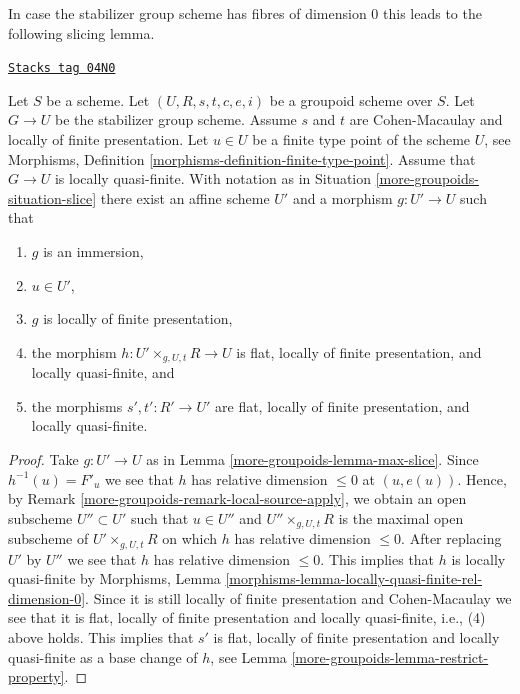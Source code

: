 In case the stabilizer group scheme has fibres of dimension 0
this leads to the following slicing lemma.

\begin{lemma}
\label{more-groupoids-lemma-max-slice-quasi-finite}
\href{https://stacks.math.columbia.edu/tag/04N0}{\texttt{Stacks tag 04N0}}

Let $S$ be a scheme.
Let $(U, R, s, t, c, e, i)$ be a groupoid scheme over $S$.
Let $G \to U$ be the stabilizer group scheme.
Assume $s$ and $t$ are Cohen-Macaulay and locally of finite presentation.
Let $u \in U$ be a finite type point of the scheme $U$, see
Morphisms, Definition \ref{morphisms-definition-finite-type-point}.
Assume that $G \to U$ is locally quasi-finite.
With notation as in
Situation \ref{more-groupoids-situation-slice}
there exist an affine scheme $U'$ and a morphism $g : U' \to U$ such that
\begin{enumerate}
\item $g$ is an immersion,
\item $u \in U'$,
\item $g$ is locally of finite presentation,
\item the morphism $h : U' \times_{g, U, t} R \longrightarrow U$
is flat, locally of finite presentation, and locally quasi-finite, and
\item the morphisms $s', t' : R' \to U'$ are flat,
locally of finite presentation, and locally quasi-finite.
\end{enumerate}
\end{lemma}

\begin{proof}
Take $g : U' \to U$ as in
Lemma \ref{more-groupoids-lemma-max-slice}.
Since $h^{-1}(u) = F'_u$ we see that $h$ has relative dimension
$\leq 0$ at $(u, e(u))$. Hence, by
Remark \ref{more-groupoids-remark-local-source-apply},
we obtain an open subscheme $U'' \subset U'$ such that
$u \in U''$ and $U'' \times_{g, U, t} R$ is the maximal open subscheme
of $U' \times_{g, U, t} R$ on which $h$ has relative dimension $\leq 0$.
After replacing $U'$ by $U''$ we see that $h$ has relative dimension $\leq 0$.
This implies that $h$ is locally quasi-finite by
Morphisms, Lemma \ref{morphisms-lemma-locally-quasi-finite-rel-dimension-0}.
Since it is still locally of finite presentation and Cohen-Macaulay we see
that it is flat, locally of finite presentation and locally quasi-finite,
i.e., (4) above holds. This implies that $s'$ is flat, locally of finite
presentation and locally quasi-finite as a base change of $h$, see
Lemma \ref{more-groupoids-lemma-restrict-property}.
\end{proof}

